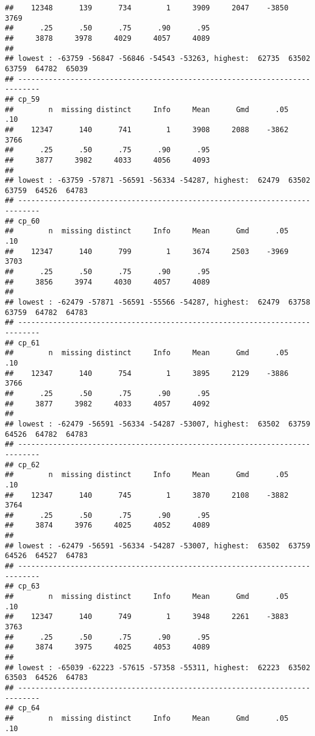 \documentclass[]{article}
\begin{document}
\begin{verbatim}
##    12348      139      734        1     3909     2047    -3850     3769 
##      .25      .50      .75      .90      .95 
##     3878     3978     4029     4057     4089 
## 
## lowest : -63759 -56847 -56846 -54543 -53263, highest:  62735  63502  63759  64782  65039
## ---------------------------------------------------------------------------
## cp_59 
##        n  missing distinct     Info     Mean      Gmd      .05      .10 
##    12347      140      741        1     3908     2088    -3862     3766 
##      .25      .50      .75      .90      .95 
##     3877     3982     4033     4056     4093 
## 
## lowest : -63759 -57871 -56591 -56334 -54287, highest:  62479  63502  63759  64526  64783
## ---------------------------------------------------------------------------
## cp_60 
##        n  missing distinct     Info     Mean      Gmd      .05      .10 
##    12347      140      799        1     3674     2503    -3969     3703 
##      .25      .50      .75      .90      .95 
##     3856     3974     4030     4057     4089 
## 
## lowest : -62479 -57871 -56591 -55566 -54287, highest:  62479  63758  63759  64782  64783
## ---------------------------------------------------------------------------
## cp_61 
##        n  missing distinct     Info     Mean      Gmd      .05      .10 
##    12347      140      754        1     3895     2129    -3886     3766 
##      .25      .50      .75      .90      .95 
##     3877     3982     4033     4057     4092 
## 
## lowest : -62479 -56591 -56334 -54287 -53007, highest:  63502  63759  64526  64782  64783
## ---------------------------------------------------------------------------
## cp_62 
##        n  missing distinct     Info     Mean      Gmd      .05      .10 
##    12347      140      745        1     3870     2108    -3882     3764 
##      .25      .50      .75      .90      .95 
##     3874     3976     4025     4052     4089 
## 
## lowest : -62479 -56591 -56334 -54287 -53007, highest:  63502  63759  64526  64527  64783
## ---------------------------------------------------------------------------
## cp_63 
##        n  missing distinct     Info     Mean      Gmd      .05      .10 
##    12347      140      749        1     3948     2261    -3883     3763 
##      .25      .50      .75      .90      .95 
##     3874     3975     4025     4053     4089 
## 
## lowest : -65039 -62223 -57615 -57358 -55311, highest:  62223  63502  63503  64526  64783
## ---------------------------------------------------------------------------
## cp_64 
##        n  missing distinct     Info     Mean      Gmd      .05      .10 

\end{verbatim}
\end{document}
